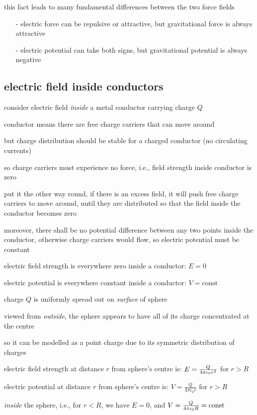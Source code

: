 this fact leads to many fundamental differences between the two force fields

\begin{itemize}
\item[-] electric force can be repulsive or attractive, but gravitational force is always attractive

\item[-] electric potential can take both signs, but gravitational potential is always negative
\end{itemize}

\subsection{electric field inside conductors}\label{inside-conductors}

consider electric field \emph{inside} a metal conductor carrying charge $Q$

conductor means there are free charge carriers that can move around 

but charge distribution should be stable for a charged conductor (no circulating currents)

so charge carriers must experience no force, i.e., field strength inside conductor is zero

put it the other way round, if there is an excess field, it will push free charge carriers to move around, until they are distributed so that the field inside the conductor becomes zero

moreover, there shall be no potential difference between any two points inside the conductor, otherwise charge carriers would flow, so electric potential must be constant

\begin{ilight}
	\centering
	
	electric field strength is everywhere zero inside a conductor: $E=0$
	
	electric potential is everywhere constant inside a conductor: $V=\text{const}$
\end{ilight}

\label{ex-metal-sphere}


\begin{soln}
charge $Q$ is uniformly spread out on \emph{surface} of sphere

viewed from \emph{outside}, the sphere appears to have all of its charge concentrated at the centre

so it can be modelled as a point charge due to its symmetric distribution of charges

electric field strength at distance $r$ from sphere's centre is: $E = \frac{Q}{4\pi\epsilon_0 r^2}$ for $r>R$

electric potential at distance $r$ from sphere's centre is: $V=\frac{Q}{4\pi\epsilon_0r}$ for $r>R$

\emph{inside} the sphere, i.e., for $r<R$, we have $E=0$, and $V=\frac{Q}{4\pi\epsilon_0 R} = \text{const}$ \end{soln}

